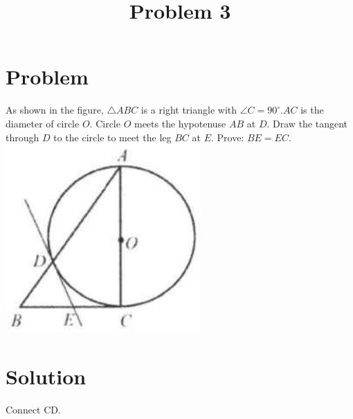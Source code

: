 \documentclass{article}
\title{Problem 3}
\date{}
\begin{document}
\maketitle

\section*{Problem}
As shown in the figure, \(\triangle A B C\) is a right triangle with \(\angle C=90^{\circ} . A C\) is the diameter of circle \(O\). Circle \(O\) meets the hypotenuse \(A B\) at \(D\). Draw the tangent through \(D\) to the circle to meet the leg \(B C\) at \(E\). Prove: \(B E=E C\).\\
\centering
\includegraphics[width=\textwidth]{images/problem_image_1.jpg}

\section*{Solution}
Connect CD.
\end{document}
